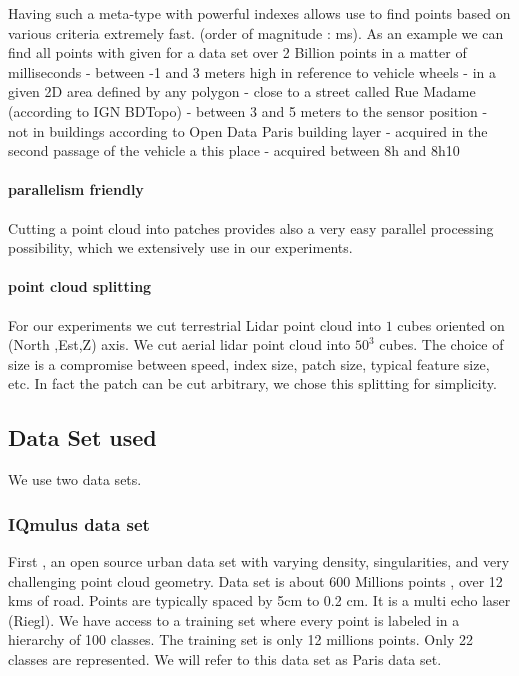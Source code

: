 				Having such a meta-type with powerful indexes allows use to find points based on various criteria extremely fast. (order of magnitude : ms). 
				As an example we can find all points with given for a data set over 2 Billion points in a matter of milliseconds 
				 - between -1 and 3 meters high in reference to vehicle wheels
				 - in a given 2D area defined by any polygon
				 - close to a street called Rue Madame (according to IGN BDTopo)
				 - between 3 and 5 meters to the sensor position 
				 - not in buildings according to Open Data Paris building layer 
				 - acquired in the second passage of the vehicle a this place
				 - acquired between 8h and 8h10
		 
		    \paragraph{parallelism friendly}
				Cutting a point cloud into patches provides also a very easy parallel processing possibility, which we extensively use in our experiments.
		
			\paragraph{point cloud splitting}
				For our experiments we cut terrestrial Lidar point cloud into $1$ \cubic \meter cubes oriented on (North ,Est,Z) axis.
				We cut aerial lidar point cloud into $50^3$ \cubic \meter cubes.
				The choice of size is a compromise between speed, index size, patch size, typical feature size, etc.
				In fact the patch can be cut arbitrary, we chose this splitting for simplicity.
		
	\subsection{Data Set used}
		We use two data sets.
		\subsubsection{IQmulus data set}
			First , an open source urban data set with varying density, singularities, and very challenging point cloud geometry.
			Data set is about 600 Millions points , over 12 kms of road. Points are typically spaced by 5cm to 0.2 cm. It is a multi echo laser (Riegl).
			We have access to a training set where every point is labeled in a hierarchy of 100 classes. The training set is only 12 millions points. Only 22 classes are represented.
			We will refer to this data set as Paris data set.
			
